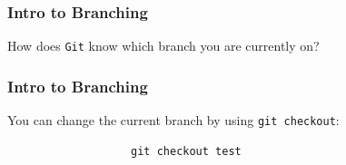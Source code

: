 \documentclass{beamer}
\begin{document}
\begin{frame}
\frametitle{Intro to Branching}
How does \texttt{Git} know which branch you are currently on? 
\begin{center}

\end{center}
\end{frame}

\begin{frame}[fragile]
\frametitle{Intro to Branching}
You can change the current branch by using \texttt{git checkout}:
\begin{center}

\begin{verbatim}
                   git checkout test
\end{verbatim}
\end{center}

\end{frame}
\end{document}
